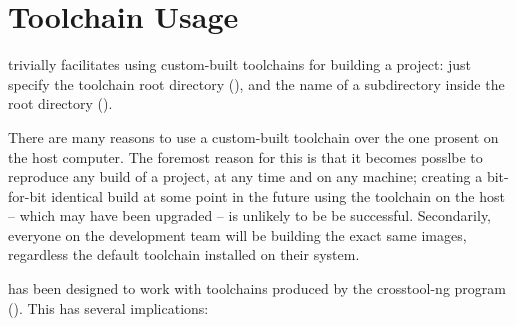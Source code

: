 %
%
%
%
\chapter{Toolchain Usage}\label{chap:toolchain-usage}

\lmsbw trivially facilitates using custom-built toolchains for
building a project: just specify the toolchain root directory
(), and the name of a subdirectory
inside the root directory ().

There are many reasons to use a custom-built toolchain over the one
prosent on the host computer.  The foremost reason for this is that it
becomes posslbe to reproduce any build of a project, at any time and
on any machine; creating a bit-for-bit identical build at some point
in the future using the toolchain on the host -- which may have been
upgraded -- is unlikely to be be successful.  Secondarily, everyone on
the development team will be building the exact same images,
regardless the default toolchain installed on their system.

\lmsbw has been designed to work with toolchains produced by the
crosstool-ng program ().  This has
several implications:

